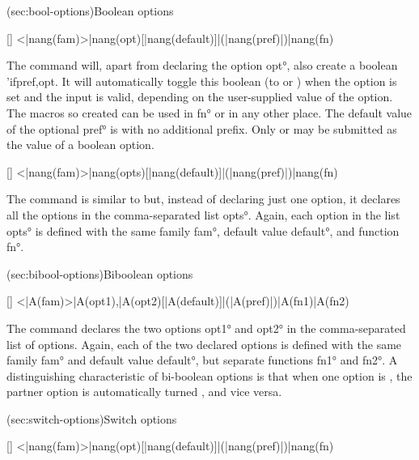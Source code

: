 \documentclass[
  use-a4-paper,
  use-10pt-font,
  final-version,
  use-UK-English,
  fancy-section-headings,
  frame-section-numbers,
  para-abstract-style,
  input-config-file,
  no-hyperref-messages
]{amltxdoc}
\begin{document}
\docsubsection(sec:bool-options){Boolean options}

[\XDeclareBooleanOption]
\XDeclareBooleanOption<|nang(fam)>{|nang(opt)}[|nang(default)]|(|nang(pref)|){|nang(fn)}
\fxim*{\XDeclareBooleanOption}

The command \fx{\XDeclareBooleanOption} will, apart from declaring the option \ang{opt}, also create a boolean \fnl*'{\bs if}{pref,opt}. It will automatically toggle this boolean (to  or ) when the option is set and the input is valid, depending on the user-supplied value of the option. The macros so created can be used in \ang{fn} or in any other place. The default value of the optional \ang{pref} is  with no additional prefix. Only  or  may be submitted as the value of a boolean option.

[\XDeclareBooleanOptions]
\XDeclareBooleanOptions<|nang(fam)>{|nang(opts)}[|nang(default)]|(|nang(pref)|){|nang(fn)}
\fxim*{\XDeclareBooleanOptions}

The command \fx{\XDeclareBooleanOptions} is similar to \fx{\XDeclareBooleanOption} but, instead of declaring just one option, it declares all the options in the comma-separated list \ang{opts}. Again, each option in the list \ang{opts} is defined with the same family \ang{fam}, default value \ang{default}, and function \ang{fn}.


\docsubsubsection(sec:bibool-options){Biboolean options}

[\XDeclareBiBooleanOptions]
\XDeclareBiBooleanOptions<|A(fam)>{|A(opt1),|A(opt2)}[|A(default)]|(|A(pref)|){|A(fn1)}{|A(fn2)}
\fxim*{\XDeclareBiBooleanOptions}

The command \fx{\XDeclareBiBooleanOptions} declares the two options \ang{opt1} and \ang{opt2} in the comma-separated list of options. Again, each of the two declared options is defined with the same family \ang{fam} and default value \ang{default}, but separate functions \ang{fn1} and \ang{fn2}. A distinguishing characteristic of bi-boolean options is that when one option is , the partner option is automatically turned , and vice versa.


\docsubsection(sec:switch-options){Switch options}

[\XDeclareSwitchOption]
\XDeclareSwitchOption<|nang(fam)>{|nang(opt)}[|nang(default)]|(|nang(pref)|){|nang(fn)}
\fxim*{\XDeclareSwitchOption}
\end{document}
